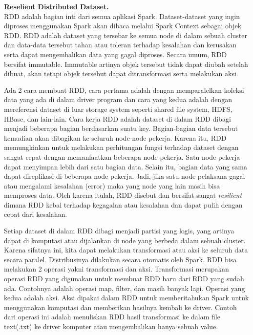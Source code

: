 \documentclass[a4paper,twoside]{article}
\begin{document}
\begin{enumerate}
\textbf{Reselient Distributed Dataset.}\\
RDD adalah bagian inti dari semua aplikasi Spark. Dataset-dataset yang ingin diproses menggunakan Spark akan dibaca melalui Spark Context sebagai objek RDD. RDD adalah dataset yang tersebar ke semua node di dalam sebuah cluster dan data-data tersebut tahan atau toleran terhadap kesalahan dan kerusakan serta dapat mengembalikan data yang gagal diproses. Secara umum, RDD bersifat immutable. Immutable artinya objek tersebut tidak dapat diubah setelah dibuat, akan tetapi objek tersebut dapat ditransformasi serta melakukan aksi. 

Ada 2 cara membuat RDD, cara pertama adalah dengan memparalelkan koleksi data yang ada di dalam driver program dan cara yang kedua adalah dengan mereferensi dataset di luar storage system seperti shared file system, HDFS, HBase, dan lain-lain. Cara kerja RDD adalah dataset di dalam RDD dibagi menjadi beberapa bagian berdasarkan suatu key. Bagian-bagian data tersebut kemudian akan dibagikan ke seluruh node-node pekerja. Karena itu, RDD memungkinkan untuk melakukan perhitungan fungsi terhadap dataset dengan sangat cepat dengan memanfaatkan beberapa node pekerja. Satu node pekerja dapat menyimpan lebih dari satu bagian data. Selain itu, bagian data yang sama dapat direplikasi di beberapa node pekerja. Jadi, jika satu node pelaksana gagal atau mengalami kesalahan (error) maka yang node yang lain masih bisa memproses data. Oleh karena itulah, RDD disebut dan bersifat sangat \textit{resilient} dimana RDD kebal terhadap kegagalan atau kesalahan dan dapat pulih dengan cepat dari kesalahan. 

Setiap dataset di dalam RDD dibagi menjadi partisi yang logis, yang artinya dapat di komputasi atau dijalankan di node yang berbeda dalam sebuah cluster. Karena sifatnya ini, kita dapat melakukan transformasi atau aksi ke seluruh data secara paralel. Distribusinya dilakukan secara otomatis oleh Spark. 
RDD bisa melakukan 2 operasi yakni transformasi dan aksi. Transformasi merupakan operasi RDD yang digunakan untuk membuat RDD baru dari RDD yang sudah ada. Contohnya adalah operasi map, filter, dan masih banyak lagi. Operasi yang kedua adalah aksi. Aksi dipakai dalam RDD untuk memberitahukan Spark untuk menggunakan komputasi dan memberikan hasilnya kembali ke driver. Contoh dari operasi ini adalah menuliskan RDD hasil transformasi ke dalam file text(.txt) ke driver komputer atau mengembalikan hanya sebuah value.\\
\\
\\


\end{enumerate}
\end{document}
